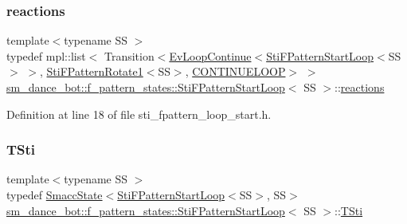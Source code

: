 \subsubsection{\texorpdfstring{reactions}{reactions}}
{\footnotesize\ttfamily template$<$typename SS $>$ \\
typedef mpl\+::list$<$ Transition$<$\hyperlink{structsmacc_1_1default__events_1_1EvLoopContinue}{Ev\+Loop\+Continue}$<$\hyperlink{structsm__dance__bot_1_1f__pattern__states_1_1StiFPatternStartLoop}{Sti\+F\+Pattern\+Start\+Loop}$<$SS$>$ $>$, \hyperlink{structsm__dance__bot_1_1f__pattern__states_1_1StiFPatternRotate1}{Sti\+F\+Pattern\+Rotate1}$<$SS$>$, \hyperlink{structsmacc_1_1default__transition__tags_1_1CONTINUELOOP}{C\+O\+N\+T\+I\+N\+U\+E\+L\+O\+OP}$>$ $>$ \hyperlink{structsm__dance__bot_1_1f__pattern__states_1_1StiFPatternStartLoop}{sm\+\_\+dance\+\_\+bot\+::f\+\_\+pattern\+\_\+states\+::\+Sti\+F\+Pattern\+Start\+Loop}$<$ SS $>$\+::\hyperlink{structsm__dance__bot_1_1f__pattern__states_1_1StiFPatternStartLoop_ab410fb656e621c3ce2ee7bb0bb11eae2}{reactions}}



Definition at line 18 of file sti\+\_\+fpattern\+\_\+loop\+\_\+start.\+h.

\mbox{\label{structsm__dance__bot_1_1f__pattern__states_1_1StiFPatternStartLoop_a18f1bcdd4f45d9230c9b23b6153ae9e2}} 
\subsubsection{\texorpdfstring{T\+Sti}{TSti}}
{\footnotesize\ttfamily template$<$typename SS $>$ \\
typedef \hyperlink{classSmaccState}{Smacc\+State}$<$\hyperlink{structsm__dance__bot_1_1f__pattern__states_1_1StiFPatternStartLoop}{Sti\+F\+Pattern\+Start\+Loop}$<$SS$>$, SS$>$ \hyperlink{structsm__dance__bot_1_1f__pattern__states_1_1StiFPatternStartLoop}{sm\+\_\+dance\+\_\+bot\+::f\+\_\+pattern\+\_\+states\+::\+Sti\+F\+Pattern\+Start\+Loop}$<$ SS $>$\+::\hyperlink{structsm__dance__bot_1_1f__pattern__states_1_1StiFPatternStartLoop_a18f1bcdd4f45d9230c9b23b6153ae9e2}{T\+Sti}}



